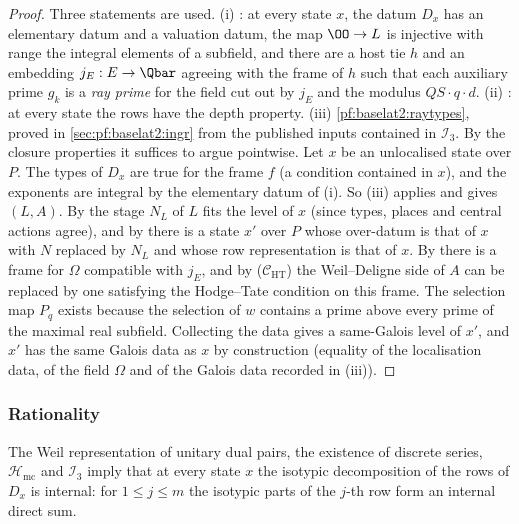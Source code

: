 \begin{proof}
Three statements are used.
(i) : at every state $x$, the datum $D_x$ has an
elementary datum and a valuation datum, the map $\OO\to L$ is injective with range the integral elements
of a subfield, and there are a host tie $h$ and an embedding $j_E:E\to\Qbar$ agreeing with the frame of
$h$ such that each auxiliary prime $g_k$ is a \emph{ray prime} for the field cut out by $j_E$ and the
modulus $QS\cdot q\cdot d$.
(ii) : at every state the rows have the depth property.
(iii) \cref{pf:baselat2:raytypes}, proved in \cref{sec:pf:baselat2:ingr} from the published inputs
contained in $\mathcal I_3$.
By the closure properties it suffices to argue pointwise. Let $x$ be an unlocalised state over $P$. The
types of $D_x$ are true for the frame $f$ (a condition contained in $x$), and the exponents are integral
by the elementary datum of (i). So (iii) applies and gives $(L,A)$. By
 the stage $N_L$ of $L$ fits the
level of $x$ (since types, places and central actions agree), and by
 there is a state $x'$ over $P$ whose
over-datum is that of $x$ with $N$ replaced by $N_L$ and whose row representation is that of $x$. By
 there is a frame for $\Omega$ compatible with
$j_E$, and by  ($\mathcal{C}_{\mathrm{HT}}$) the
Weil--Deligne side of $A$ can be replaced by one satisfying the Hodge--Tate condition on this frame. The
selection map $P_q$ exists because the selection of $w$ contains a prime above every prime of the maximal
real subfield. Collecting the data
gives a same-Galois level of $x'$, and $x'$ has the same Galois data as $x$ by construction (equality
of the localisation data, of the field $\Omega$ and of the Galois data recorded in (iii)).
\end{proof}

\subsubsection{Rationality}

\begin{lemma}\label{pf:baselat2:isot}
The Weil representation of unitary dual pairs, the existence of discrete series, $\mathcal{H}_{\mathrm{mc}}$
and $\mathcal{I}_3$ imply that at every state $x$ the isotypic decomposition of the
rows of $D_x$ is internal: for $1\le j\le m$ the isotypic parts of the $j$-th row form an internal direct
sum.
\end{lemma}

